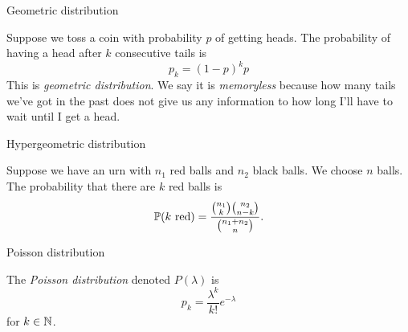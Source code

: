 %
\begin{note}
  \begin{field}
    Geometric distribution
  \end{field}
  \begin{field}
    \begin{defi}
      Suppose we toss a coin with probability $p$ of getting heads. The probability of having a head after $k$ consecutive tails is
      \[
        p_k = (1- p)^k p
      \]
      This is \emph{geometric distribution}. We say it is \emph{memoryless} because how many tails we've got in the past does not give us any information to how long I'll have to wait until I get a head.
    \end{defi}
  \end{field}
  \xplain{}%
\end{note}

%
\begin{note}
  \begin{field}
    Hypergeometric distribution
  \end{field}
  \begin{field}
    \begin{defi}
      Suppose we have an urn with $n_1$ red balls and $n_2$ black balls. We choose $n$ balls. The probability that there are $k$ red balls is
      \[
        \P(k\text{ red}) = \frac{\binom{n_1}{k}\binom{n_2}{n - k}}{\binom{n_1 + n_2}{n}}.
      \]
    \end{defi}
  \end{field}
  \xplain{}%
\end{note}

%
\begin{note}
  \begin{field}
    Poisson distribution
  \end{field}
  \begin{field}
    \begin{defi}
      The \emph{Poisson distribution} denoted $P(\lambda)$ is
      \[
        p_k = \frac{\lambda^k}{k!}e^{-\lambda}
      \]
      for $k\in \N$.
    \end{defi}
  \end{field}
  \xplain{}%
\end{note}


